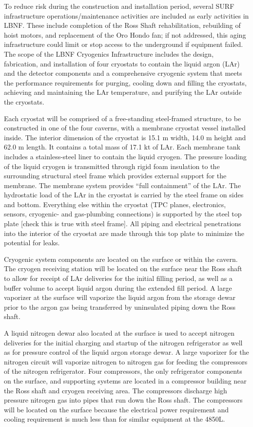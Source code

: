 To reduce risk during the construction and installation period, several SURF infrastructure operations/maintenance activities are included as early activities in LBNF. These include completion of the Ross Shaft rehabilitation, rebuilding of hoist motors, and replacement of the Oro Hondo fan; if not addressed, this aging infrastructure could limit or stop access to the underground if equipment failed. 
The scope of the LBNF Cryogenics Infrastructure includes the design, fabrication, and installation of four cryostats to contain the liquid argon (LAr) and the detector components and a comprehensive cryogenic system that meets the performance requirements for purging, cooling down and filling the cryostats, achieving and maintaining the LAr temperature, and purifying the LAr outside the cryostats. 

Each cryostat will be comprised of a free-standing steel-framed structure, to be constructed in one of the four caverns, with a membrane cryostat vessel installed inside. The interior dimension of the cryostat is 15.1 m width, 14.0 m height and 62.0 m length. It contains a total mass of 17.1 kt of LAr. Each membrane tank includes a stainless-steel liner to contain the liquid cryogen. The pressure loading of the liquid cryogen is transmitted through rigid foam insulation to the surrounding structural steel frame which provides external support for the membrane. The membrane system provides “full containment” of the LAr. The hydrostatic load of the LAr in the cryostat is carried by the steel frame on sides and bottom. Everything else within the cryostat (TPC planes, electronics, sensors, cryogenic- and gas-plumbing connections) is supported by the steel top plate [check this is true with steel frame]. All piping and electrical penetrations into the interior of the cryostat are made through this top plate to minimize the potential for leaks.

Cryogenic system components are located on the surface or within the cavern. The cryogen receiving station will be located on the surface near the Ross shaft to allow for receipt of LAr deliveries for the initial filling period, as well as a buffer volume to accept liquid argon during the extended fill period. A large vaporizer at the surface will vaporize the liquid argon from the storage dewar prior to the argon gas being transferred by uninsulated piping down the Ross shaft. 

A liquid nitrogen dewar also located at the surface is used to accept nitrogen deliveries for the initial charging and startup of the nitrogen refrigerator as well as for pressure control of the liquid argon storage dewar. A large vaporizer for the nitrogen circuit will vaporize nitrogen to nitrogen gas for feeding the compressors of the nitrogen refrigerator. Four compressors, the only refrigerator components on the surface, and supporting systems are located in a compressor building near the Ross shaft and cryogen receiving area. The compressors discharge high pressure nitrogen gas into pipes that run down the Ross shaft. The compressors will be located on the surface because the electrical power requirement and cooling requirement is much less than for similar equipment at the 4850L.  

